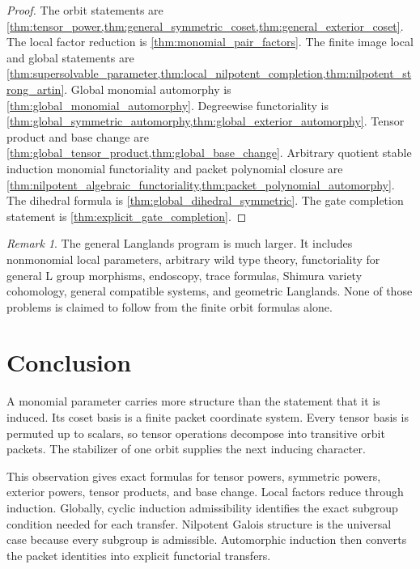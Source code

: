 \documentclass{aomart}
\theoremstyle{definition}
\theoremstyle{remark}
\newtheorem{remark}[remark]{Remark}
\begin{document}
\begin{proof}
The orbit statements are \cref{thm:tensor_power,thm:general_symmetric_coset,thm:general_exterior_coset}. The local factor reduction is \cref{thm:monomial_pair_factors}. The finite image local and global statements are \cref{thm:supersolvable_parameter,thm:local_nilpotent_completion,thm:nilpotent_strong_artin}. Global monomial automorphy is \cref{thm:global_monomial_automorphy}. Degreewise functoriality is \cref{thm:global_symmetric_automorphy,thm:global_exterior_automorphy}. Tensor product and base change are \cref{thm:global_tensor_product,thm:global_base_change}. Arbitrary quotient stable induction monomial functoriality and packet polynomial closure are \cref{thm:nilpotent_algebraic_functoriality,thm:packet_polynomial_automorphy}. The dihedral formula is \cref{thm:global_dihedral_symmetric}. The gate completion statement is \cref{thm:explicit_gate_completion}.
\end{proof}

\begin{remark}\label{rem:general_langlands_boundary}
The general Langlands program is much larger. It includes nonmonomial local parameters, arbitrary wild type theory, functoriality for general L group morphisms, endoscopy, trace formulas, Shimura variety cohomology, general compatible systems, and geometric Langlands. None of those problems is claimed to follow from the finite orbit formulas alone.
\end{remark}

\section{Conclusion}\label{sec:conclusion}

A monomial parameter carries more structure than the statement that it is induced. Its coset basis is a finite packet coordinate system. Every tensor basis is permuted up to scalars, so tensor operations decompose into transitive orbit packets. The stabilizer of one orbit supplies the next inducing character.

This observation gives exact formulas for tensor powers, symmetric powers, exterior powers, tensor products, and base change. Local factors reduce through induction. Globally, cyclic induction admissibility identifies the exact subgroup condition needed for each transfer. Nilpotent Galois structure is the universal case because every subgroup is admissible. Automorphic induction then converts the packet identities into explicit functorial transfers.
\end{document}
